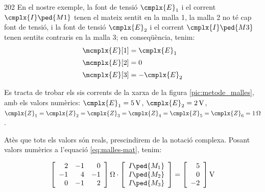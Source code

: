 \begin{dingautolist}{202}
         En el nostre exemple,  la font de tensió $\cmplx{E}_1$ i el corrent $\cmplx{I}\ped{M1}$ tenen el mateix sentit en la malla 1, la malla 2 no té cap font de tensió, i  la font de tensió  $\cmplx{E}_2$ i el corrent $\cmplx{I}\ped{M3}$ tenen   sentits contraris en la malla 3; en conseqüència, tenim:
        \begin{align*}
            \mcmplx{E}[1] &= \cmplx{E}_1 \\[0.5ex]
            \mcmplx{E}[2] &= 0 \\[0.5ex]
            \mcmplx{E}[3] &= -\cmplx{E}_2
        \end{align*}
\end{dingautolist}


\begin{exemple}\label{ex:Malles}
	\addcontentsxms{\Malles}	
    Es tracta de trobar els sis corrents de la xarxa de la figura \vref{pic:metode_malles}, amb els valors numèrics: $\cmplx{E}_1=\qty{5}{V}$, $\cmplx{E}_2=\qty{2}{V}$, $\cmplx{Z}_1=\cmplx{Z}_2=\cmplx{Z}_3=\cmplx{Z}_4=\cmplx{Z}_5=\cmplx{Z}_6=\qty{1}{\ohm}$.

    Atès que tots els valors són reals, prescindirem de la notació complexa. Posant valors numèrics a l'equació \eqref{eq:malles-mat}, tenim:

    \[
      \begin{bmatrix}\begin{array}{rrr} 
          2 & -1 &  0 \\
         -1 &  4 & -1 \\
          0 &  -1 & 2 
      \end{array}\end{bmatrix}\unit{\ohm}
      \cdot
      \begin{bmatrix}\begin{array}{c} 
            I\ped{M_1} \\
            I\ped{M_2} \\
            I\ped{M_3} 
      \end{array}\end{bmatrix}
      =
      \begin{bmatrix}\begin{array}{r} 
            5 \\
            0 \\
            -2 
      \end{array}\end{bmatrix}\unit{V}
    \]


\end{exemple}
